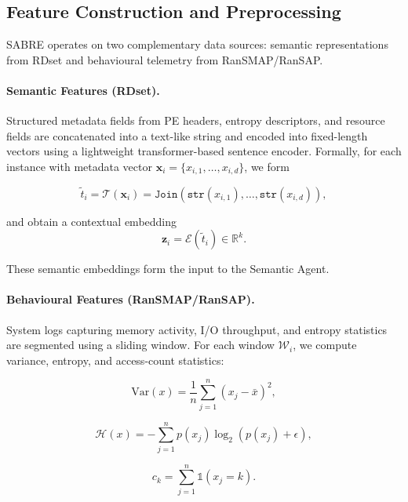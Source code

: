 \documentclass[3p]{elsarticle}
\begin{document}
\subsection{Feature Construction and Preprocessing}

SABRE operates on two complementary data sources: semantic representations from RDset and behavioural telemetry from RanSMAP/RanSAP.

\paragraph{Semantic Features (RDset).}
Structured metadata fields from PE headers, entropy
descriptors, and resource fields are concatenated into a text-like string and encoded into fixed-length vectors using a lightweight transformer-based
sentence encoder. Formally, for each instance with metadata vector
$\mathbf{x}_i = \{x_{i,1}, \ldots, x_{i,d}\}$, we form

\begin{equation}
\tilde{t}_i = \mathcal{T}(\mathbf{x}_i) = \texttt{Join}(\texttt{str}(x_{i,1}), \ldots, \texttt{str}(x_{i,d})),
\end{equation}

and obtain a contextual embedding
\begin{equation}
\mathbf{z}_i = \mathcal{E}(\tilde{t}_i) \in \mathbb{R}^{k}.
\end{equation}

These semantic embeddings form the input to the Semantic Agent.

\paragraph{Behavioural Features (RanSMAP/RanSAP).}
System logs capturing memory activity, I/O throughput, and entropy statistics are segmented using a sliding window. For each window $\mathcal{W}_i$, we compute variance, entropy, and access-count statistics:

\begin{equation}
\mathrm{Var}(x) = \frac{1}{n}\sum_{j=1}^{n}(x_j - \bar{x})^2,
\end{equation}

\begin{equation}
\mathcal{H}(x) = -\sum_{j=1}^{n} p(x_j)\log_2(p(x_j)+\epsilon),
\end{equation}

\begin{equation}
c_k = \sum_{j=1}^{n} \mathbb{1}(x_j = k).
\end{equation}
\end{document}
